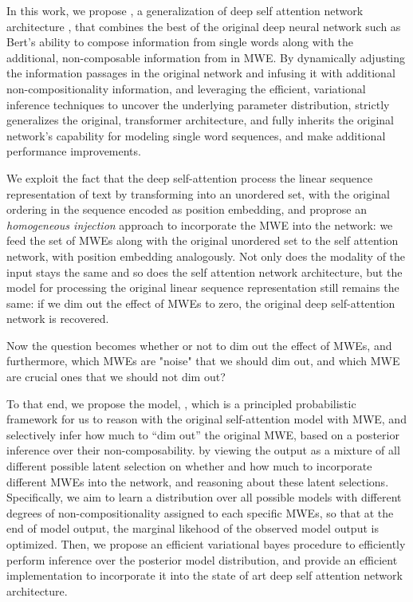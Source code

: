 In this work, 
we propose \BertMWE, a generalization of deep self attention network architecture \cite{vaswani2017attention}, 
that combines the best of the original deep neural network such as Bert's ability to compose information from single words \cite{devlin2018bert} along with the additional, non-composable information from in MWE.
By dynamically adjusting the information passages in the original network and infusing it with additional non-compositionality information, 
and leveraging the efficient, variational inference techniques to uncover the underlying parameter distribution, 
\BertMWE strictly generalizes the original, transformer architecture, and fully inherits the original network's capability for modeling single word sequences, and make additional performance improvements.

We exploit the fact that the deep self-attention process the linear sequence representation of text by transforming into an unordered set, with the original ordering in the sequence encoded as position embedding,
and proprose an \textit{homogeneous injection} approach to incorporate the MWE into the network:
we feed the set of MWEs along with the original unordered set to the self attention network, with position embedding analogously.
Not only does the modality of the input stays the same and so does the self attention network architecture,
but the model for processing the original linear sequence representation still remains the same: if we dim out the effect of MWEs to zero, the original deep self-attention network is recovered.

Now the question becomes whether or not to dim out the effect of MWEs, and furthermore, which MWEs are "noise" that  we should dim out, and which MWE are crucial ones that we should not dim out?

To that end, we propose the model, \BertMWE , 
which is a principled probabilistic framework for us to reason with the original self-attention model with MWE, and selectively infer how much to “dim out” the original MWE, based on a posterior inference over their non-composability.
by viewing the output as a mixture of all different possible latent selection on whether and how much to incorporate different MWEs into the network, and reasoning about these latent selections.
Specifically, we aim to learn a distribution over all possible models  with different degrees of non-compositionality assigned to each specific MWEs,  so that at the end of model output, the marginal likehood of the observed model output is optimized.
Then, we propose an efficient variational bayes procedure  to efficiently perform inference over the posterior model distribution, and provide an efficient implementation to incorporate it into the state of art deep self attention network architecture. 


